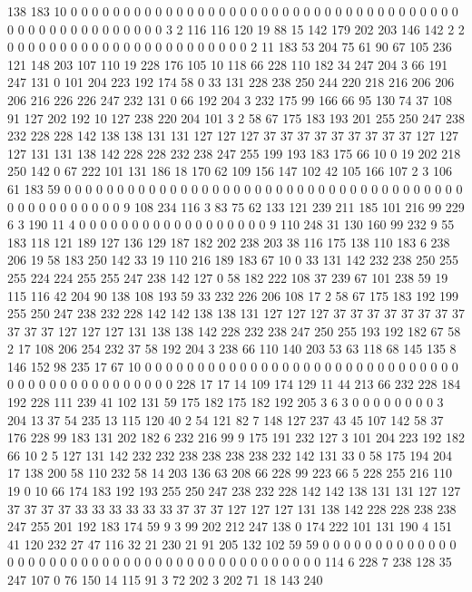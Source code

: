 138 183 10 0 0 0 0 0 0 0 0 0 0 0 0 0 0 0 0 0
0 0 0 0 0 0 0 0 0 0 0 0 0 0 0 0 0 0 0 0
0 0 0 0 0 0 0 0 0 0 0 0 0 0 0 3 2 116 116 120
19 88 15 142 179 202 203 146 142 2 2 0 0 0 0 0 0 0 0 0
0 0 0 0 0 0 0 0 0 0 0 0 0 0 2 11 183 53 204 75
61 90 67 105 236 121 148 203 107 110 19 228 176 105 10 118 66 228 110 182
34 247 204 3 66 191 247 131 0 101 204 223 192 174 58 0 33 131 228 238
250 244 220 218 216 206 206 206 216 226 226 247 232 131 0 66 192 204 3 232
175 99 166 66 95 130 74 37 108 91 127 202 192 10 127 238 220 204 101 3
2 58 67 175 183 193 201 255 250 247 238 232 228 228 142 138 138 131 131 127
127 127 37 37 37 37 37 37 37 37 37 127 127 127 131 131 138 142 228 228
232 238 247 255 199 193 183 175 66 10 0 19 202 218 250 142 0 67 222 101
131 186 18 170 62 109 156 147 102 42 105 166 107 2 3 106 61 183 59 0
0 0 0 0 0 0 0 0 0 0 0 0 0 0 0 0 0 0 0 0
0 0 0 0 0 0 0 0 0 0 0 0 0 0 0 0 0 0 0 0
0 0 0 0 0 0 0 0 9 108 234 116 3 83 75 62 133 121 239 211
185 101 216 99 229 6 3 190 11 4 0 0 0 0 0 0 0 0 0 0
0 0 0 0 0 0 0 0 9 110 248 31 130 160 99 232 9 55 183 118
121 189 127 136 129 187 182 202 238 203 38 116 175 138 110 183 6 238 206 19
58 183 250 142 33 19 110 216 189 183 67 10 0 33 131 142 232 238 250 255
255 224 224 255 255 247 238 142 127 0 58 182 222 108 37 239 67 101 238 59
19 115 116 42 204 90 138 108 193 59 33 232 226 206 108 17 2 58 67 175
183 192 199 255 250 247 238 232 228 142 142 138 138 131 127 127 127 37 37 37
37 37 37 37 37 37 37 37 127 127 127 131 138 138 142 228 232 238 247 250
255 193 192 182 67 58 2 17 108 206 254 232 37 58 192 204 3 238 66 110
140 203 53 63 118 68 145 135 8 146 152 98 235 17 67 10 0 0 0 0
0 0 0 0 0 0 0 0 0 0 0 0 0 0 0 0 0 0 0 0
0 0 0 0 0 0 0 0 0 0 0 0 0 0 0 0 0 0 0 0
0 0 228 17 17 14 109 174 129 11 44 213 66 232 228 184 192 228 111 239
41 102 131 59 175 182 175 182 192 205 3 6 3 0 0 0 0 0 0 0
0 3 204 13 37 54 235 13 115 120 40 2 54 121 82 7 148 127 237 43
45 107 142 58 37 176 228 99 183 131 202 182 6 232 216 99 9 175 191 232
127 3 101 204 223 192 182 66 10 2 5 127 131 142 232 232 238 238 238 238
232 142 131 33 0 58 175 194 204 17 138 200 58 110 232 58 14 203 136 63
208 66 228 99 223 66 5 228 255 216 110 19 0 10 66 174 183 192 193 255
250 247 238 232 228 142 142 138 131 131 127 127 37 37 37 37 33 33 33 33
33 33 37 37 37 127 127 127 131 138 142 228 228 238 238 247 255 201 192 183
174 59 9 3 99 202 212 247 138 0 174 222 101 131 190 4 151 41 120 232
27 47 116 32 21 230 21 91 205 132 102 59 59 0 0 0 0 0 0 0
0 0 0 0 0 0 0 0 0 0 0 0 0 0 0 0 0 0 0 0
0 0 0 0 0 0 0 0 0 0 0 0 0 0 0 0 114 6 228 7
238 128 35 247 107 0 76 150 14 115 91 3 72 202 3 202 71 18 143 240
